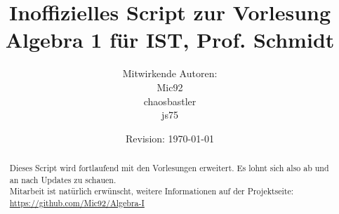 \begin{titlepage}
\title{Inoffizielles Script zur Vorlesung Algebra 1 für IST, Prof. Schmidt}
\author{Mitwirkende Autoren:\\
Mic92
\\
chaosbastler
\\
js75
}
\date{Revision: \today}
\maketitle

\begin{abstract}
Dieses Script wird fortlaufend mit den Vorlesungen erweitert. Es lohnt sich also ab und an nach Updates zu schauen.
\\Mitarbeit ist natürlich erwünscht, weitere Informationen auf der Projektseite: \url{https://github.com/Mic92/Algebra-I}
\end{abstract}
\end{titlepage}
